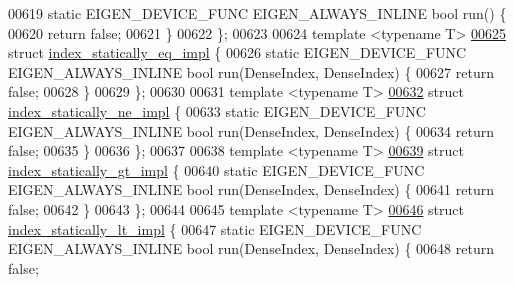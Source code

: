 \begin{DoxyCode}
00619   \textcolor{keyword}{static} EIGEN\_DEVICE\_FUNC EIGEN\_ALWAYS\_INLINE \textcolor{keywordtype}{bool} run() \{
00620     \textcolor{keywordflow}{return} \textcolor{keyword}{false};
00621   \}
00622 \};
00623 
00624 \textcolor{keyword}{template} <\textcolor{keyword}{typename} T>
\hyperlink{struct_eigen_1_1internal_1_1index__statically__eq__impl}{00625} \textcolor{keyword}{struct }\hyperlink{struct_eigen_1_1internal_1_1index__statically__eq__impl}{index\_statically\_eq\_impl} \{
00626   \textcolor{keyword}{static} EIGEN\_DEVICE\_FUNC EIGEN\_ALWAYS\_INLINE \textcolor{keywordtype}{bool} run(DenseIndex, DenseIndex) \{
00627     \textcolor{keywordflow}{return} \textcolor{keyword}{false};
00628   \}
00629 \};
00630 
00631 \textcolor{keyword}{template} <\textcolor{keyword}{typename} T>
\hyperlink{struct_eigen_1_1internal_1_1index__statically__ne__impl}{00632} \textcolor{keyword}{struct }\hyperlink{struct_eigen_1_1internal_1_1index__statically__ne__impl}{index\_statically\_ne\_impl} \{
00633   \textcolor{keyword}{static} EIGEN\_DEVICE\_FUNC EIGEN\_ALWAYS\_INLINE \textcolor{keywordtype}{bool} run(DenseIndex, DenseIndex) \{
00634     \textcolor{keywordflow}{return} \textcolor{keyword}{false};
00635   \}
00636 \};
00637 
00638 \textcolor{keyword}{template} <\textcolor{keyword}{typename} T>
\hyperlink{struct_eigen_1_1internal_1_1index__statically__gt__impl}{00639} \textcolor{keyword}{struct }\hyperlink{struct_eigen_1_1internal_1_1index__statically__gt__impl}{index\_statically\_gt\_impl} \{
00640   \textcolor{keyword}{static} EIGEN\_DEVICE\_FUNC EIGEN\_ALWAYS\_INLINE \textcolor{keywordtype}{bool} run(DenseIndex, DenseIndex) \{
00641     \textcolor{keywordflow}{return} \textcolor{keyword}{false};
00642   \}
00643 \};
00644 
00645 \textcolor{keyword}{template} <\textcolor{keyword}{typename} T>
\hyperlink{struct_eigen_1_1internal_1_1index__statically__lt__impl}{00646} \textcolor{keyword}{struct }\hyperlink{struct_eigen_1_1internal_1_1index__statically__lt__impl}{index\_statically\_lt\_impl} \{
00647   \textcolor{keyword}{static} EIGEN\_DEVICE\_FUNC EIGEN\_ALWAYS\_INLINE \textcolor{keywordtype}{bool} run(DenseIndex, DenseIndex) \{
00648     \textcolor{keywordflow}{return} \textcolor{keyword}{false};

\end{DoxyCode}
